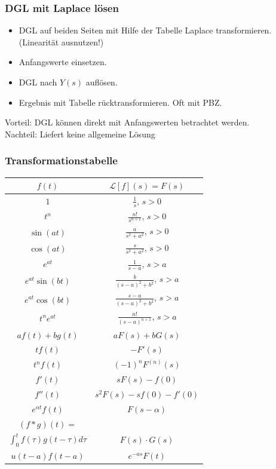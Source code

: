 \documentclass[8pt, a4paper, landscape, fleqn]{scrartcl}
\begin{document}
\begin{multicols*}{3}
		\subsubsection{DGL mit Laplace lösen}
		\begin{itemize}
		    \item DGL auf beiden Seiten mit Hilfe der Tabelle Laplace transformieren. (Linearität ausnutzen!)
		    \item Anfangswerte einsetzen.
		    \item DGL nach $Y(s)$ auflösen.
		    \item Ergebnis mit Tabelle rücktransformieren. Oft mit PBZ. 
		\end{itemize}
		Vorteil: DGL können direkt mit Anfangswerten betrachtet werden. \\
		Nachteil: Liefert keine allgemeine Lösung
		
		\subsubsection{Transformationstabelle}
		\begin{center}
		\begin{tabular}{|c|c|}
			\hline
		    $f(t)$     &$\mathcal{L}[f](s) = F(s)$ \\
			\hline
			\hline
			$1$        &$\frac{1}{s}$, $s>0$ \\
			\hline
			$t^n$      &$\frac{n!}{s^{n+1}}$, $s>0$ \\
			\hline
			$\sin(at)$  &$\frac{a}{s^2+a^2}$, $s>0$ \\
			\hline
			$\cos(at)$  &$\frac{s}{s^2+a^2}$, $s>0$ \\ 
			\hline 
			$e^{at}$     &$\frac{1}{s-a}$, $s>a$ \\
			\hline
			$e^{at}\sin(bt)$ &$\frac{b}{(s-a)^2+b^2}$, $s>a$ \\
			\hline
			$e^{at}\cos(bt)$ &$\frac{s-a}{(s-a)^2+b^2}$, $s>a$ \\
			\hline
			$t^ne^{at}$     &$\frac{n!}{(s-a)^{n+1}}$, $s>a$ \\
			\hline
			$af(t) + bg(t)$ &$aF(s) + bG(s)$ \\
			\hline
			$tf(t)$     &$-F'(s)$ \\
			\hline
			$t^n f(t)$  &$(-1)^n F^{(n)}(s)$ \\
			\hline
			$f'(t)$     &$sF(s) - f(0)$\\
			\hline
			$f''(t)$    &$s^2F(s) - sf(0) - f'(0)$ \\
            \hline
            $e^{\alpha t}f(t)$ &$F(s-\alpha)$ \\
            \hline
            $(f*g)(t) =$ & \\ $\int_0^t f(\tau)g(t-\tau)d\tau$ &$F(s) \cdot G(s)$ \\
            \hline
            $u(t-a)f(t-a)$ &$e^{-as}F(t)$ \\
            

\end{tabular}
\end{center}
\end{multicols*}
\end{document}
